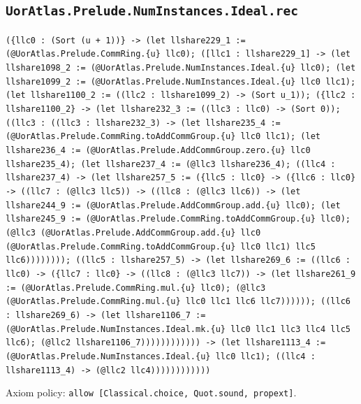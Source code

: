 \documentclass[11pt]{article}
\begin{document}
\subsection*{\texttt{UorAtlas.Prelude.NumInstances.Ideal.rec}}
\noindent\texttt{(\{llc0 : (Sort (u + 1))\} -> (let llshare229\_1 := (@UorAtlas.Prelude.CommRing.\{u\} llc0); ([llc1 : llshare229\_1] -> (let llshare1098\_2 := (@UorAtlas.Prelude.NumInstances.Ideal.\{u\} llc0); (let llshare1099\_2 := (@UorAtlas.Prelude.NumInstances.Ideal.\{u\} llc0 llc1); (let llshare1100\_2 := ((llc2 : llshare1099\_2) -> (Sort u\_1)); (\{llc2 : llshare1100\_2\} -> (let llshare232\_3 := ((llc3 : llc0) -> (Sort 0)); ((llc3 : ((llc3 : llshare232\_3) -> (let llshare235\_4 := (@UorAtlas.Prelude.CommRing.toAddCommGroup.\{u\} llc0 llc1); (let llshare236\_4 := (@UorAtlas.Prelude.AddCommGroup.zero.\{u\} llc0 llshare235\_4); (let llshare237\_4 := (@llc3 llshare236\_4); ((llc4 : llshare237\_4) -> (let llshare257\_5 := (\{llc5 : llc0\} -> (\{llc6 : llc0\} -> ((llc7 : (@llc3 llc5)) -> ((llc8 : (@llc3 llc6)) -> (let llshare244\_9 := (@UorAtlas.Prelude.AddCommGroup.add.\{u\} llc0); (let llshare245\_9 := (@UorAtlas.Prelude.CommRing.toAddCommGroup.\{u\} llc0); (@llc3 (@UorAtlas.Prelude.AddCommGroup.add.\{u\} llc0 (@UorAtlas.Prelude.CommRing.toAddCommGroup.\{u\} llc0 llc1) llc5 llc6)))))))); ((llc5 : llshare257\_5) -> (let llshare269\_6 := ((llc6 : llc0) -> (\{llc7 : llc0\} -> ((llc8 : (@llc3 llc7)) -> (let llshare261\_9 := (@UorAtlas.Prelude.CommRing.mul.\{u\} llc0); (@llc3 (@UorAtlas.Prelude.CommRing.mul.\{u\} llc0 llc1 llc6 llc7)))))); ((llc6 : llshare269\_6) -> (let llshare1106\_7 := (@UorAtlas.Prelude.NumInstances.Ideal.mk.\{u\} llc0 llc1 llc3 llc4 llc5 llc6); (@llc2 llshare1106\_7)))))))))))) -> (let llshare1113\_4 := (@UorAtlas.Prelude.NumInstances.Ideal.\{u\} llc0 llc1); ((llc4 : llshare1113\_4) -> (@llc2 llc4))))))))))))}\par
\noindent Axiom policy: \texttt{allow [Classical.choice, Quot.sound, propext]}.\par
\end{document}
